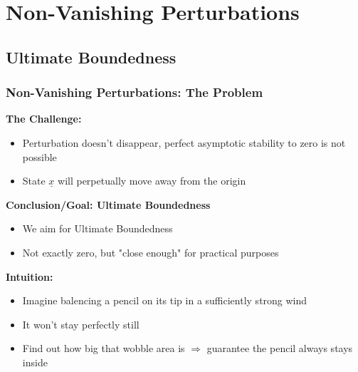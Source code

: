 \documentclass[student, noshadow, lsr, english, aspectratio=169, t]{ITR_LSR_slides}
\begin{document}
\section{Non-Vanishing Perturbations}
\subsection*{Ultimate Boundedness} %

\begin{frame}
    \frametitle{Non-Vanishing Perturbations: The Problem}
	\textbf{The Challenge:}
    \begin{itemize}
        \item Perturbation doesn't disappear, perfect asymptotic stability to zero is not possible
        \item State $\underline{x}$ will perpetually move away from the origin
    \end{itemize}

    \vspace{0.3cm}
    \textbf{Conclusion/Goal: Ultimate Boundedness}
    \begin{itemize}
        \item We aim for Ultimate Boundedness
        \item Not exactly zero, but "close enough" for practical purposes
    \end{itemize}

	\vspace{0.3cm}
    \textbf{Intuition:}
    \begin{itemize}
        \item Imagine balencing a pencil on its tip in a sufficiently strong wind
        \item It won't stay perfectly still
        \item Find out how big that wobble area is $\Rightarrow$ guarantee the pencil always stays inside
    \end{itemize}
\end{frame}
\end{document}
